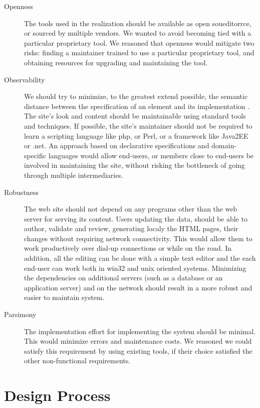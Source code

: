 \documentclass[10pt]{article}
\begin{document}
\begin{description}
\item[Openness] The tools used in the realization
should be available as open soueditorrce, or sourced by multiple vendors.
We wanted to avoid becoming tied with a particular proprietary
tool.
We reasoned that openness would mitigate two risks:
finding a maintainer trained to use a particular proprietary tool,
and obtaining resources for upgrading and maintaining the tool.

\item[Observability]
We should try to minimize,
to the greatest extend possible, the semantic distance between
the specification of an element and its implementation \cite{SG97}.
The site's look and content should be maintainable
using standard tools and techniques.
If possible, the site's maintainer should not be required to
learn a scripting language like {\sc php}, or Perl, or
a framework like Java2EE or {\sc .net}.
An approach based on declarative specifications and
domain-specific languages would allow end-users, or members
close to end-users be involved in maintaining the site,
without risking the bottleneck of going through
multiple intermediaries.

\item[Robustness] The web site should not depend on
any programs other than the web server for serving
its content.
Users updating the data, should be able to author, validate and 
review, generating localy the HTML pages, 
their changes without requiring network connectivity.
This would allow them to work productively over dial-up connections
or while on the road. In addition, all the editing can be done with 
a simple text editor and the each end-user can work both in win32 and unix oriented systems.
Minimizing the dependencies on additional servers (such as a
database or an application server) and on the network
should result in a more robust and easier to maintain system.   

\item[Parsimony] The implementation effort for
implementing the system should be minimal.
This would minimize errors and maintenance costs.
We reasoned we could satisfy this requirement by
using existing tools, if their choice satisfied the
other non-functional requirements.

\end{description} 

\section{Design Process}
\end{document}
